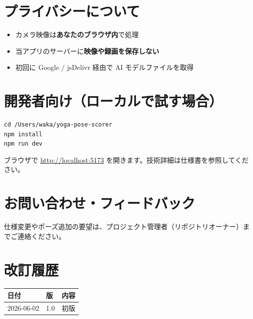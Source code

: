 \documentclass[a4paper,11pt]{ltjsarticle}
\begin{document}
\section{プライバシーについて}

\begin{itemize}
  \item カメラ映像は\textbf{あなたのブラウザ内}で処理
  \item 当アプリのサーバーに\textbf{映像や録画を保存しない}
  \item 初回に Google / jsDelivr 経由で AI モデルファイルを取得
\end{itemize}

\section{開発者向け（ローカルで試す場合）}

\begin{lstlisting}
cd /Users/waka/yoga-pose-scorer
npm install
npm run dev
\end{lstlisting}

ブラウザで \url{http://localhost:5173} を開きます。技術詳細は仕様書を参照してください。

\section{お問い合わせ・フィードバック}

仕様変更やポーズ追加の要望は、プロジェクト管理者（リポジトリオーナー）までご連絡ください。

\section{改訂履歴}

\begin{table}[h]
  \centering
  \begin{tabular}{@{}lll@{}}
    \toprule
    日付 & 版 & 内容 \\
    \midrule
    2026-06-02 & 1.0 & 初版 \\
    \bottomrule
  \end{tabular}
\end{table}
\end{document}
